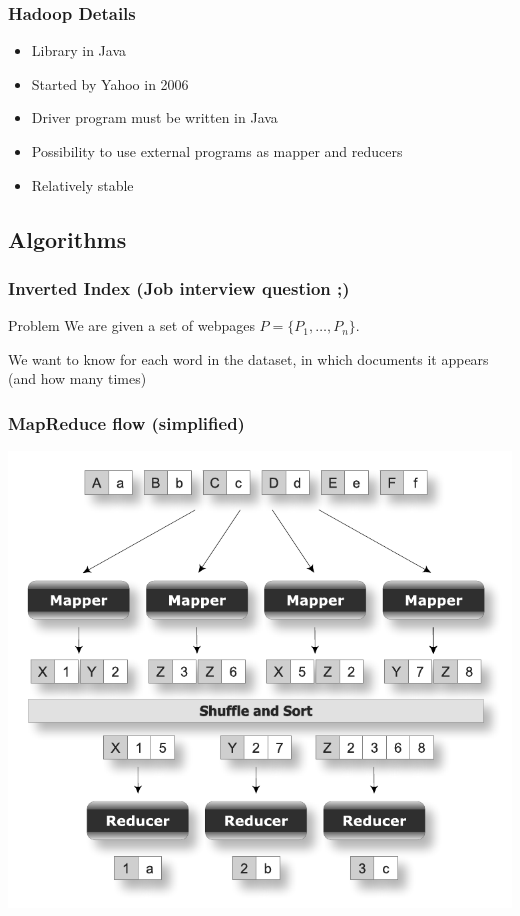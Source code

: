\begin{frame}
\frametitle{Hadoop Details}
\begin{itemize}
\item Library in Java
\item Started by Yahoo in 2006
\item Driver program must be written in Java
\item Possibility to use external programs as mapper and reducers
\item Relatively stable
\end{itemize}
\end{frame}

\subsection{Algorithms}
\begin{frame}
\frametitle{Inverted Index (Job interview question ;)}
\begin{block}{Problem}
  We are given a set of webpages $P=\{P_1,\ldots,P_n\}$. 
  
  We want to know for each word in the dataset, in which documents it appears (and how many times)
\end{block}
\end{frame}

\begin{frame}
\frametitle{MapReduce flow (simplified)}
\begin{center}
\includegraphics[scale=0.6,keepaspectratio=true]{figs/12/mapreduce_flow.pdf}
\end{center}
\end{frame}


